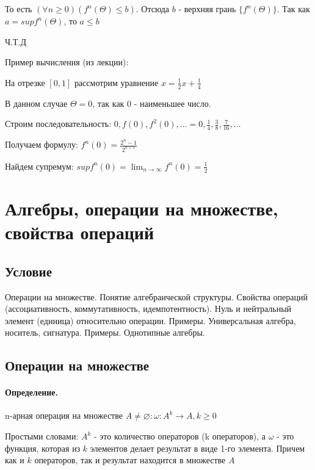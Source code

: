 \documentclass{report}
\begin{document}
То есть $(\forall n \geq 0)(f^{n}(\Theta) \leq b)$. Отсюда $b$ - верхняя грань $\{f^{n}(\Theta)\}$.
Так как $a = supf^{n}(\Theta)$, то $a \leq b$

\medskip

Ч.Т.Д

\medskip

Пример вычисления (из лекции):

На отрезке $[0,1]$ рассмотрим уравнение $x = \frac{1}{2}x + \frac{1}{4}$

В данном случае $\Theta = 0$, так как $0$ - наименьшее число.

Строим последовательность: $0, f(0), f^{2}(0), \ldots =
	0, \frac{1}{4}, \frac{3}{8}, \frac{7}{16}, \ldots$

\medskip

Получаем формулу: $f^{n}(0) = \frac{2^{n} - 1}{2^{n+1}}$

Найдем супремум: $supf^{n}(0) = \lim_{n \to \infty} f^{n}(0) = \frac{1}{2}$

\newpage

\section{Алгебры, операции на множестве, свойства операций}
\subsection{Условие}
Операции на множестве. Понятие алгебраической структуры. Свойства операций
(ассоциативность, коммутативность, идемпотентность). Нуль и нейтральный элемент
(единица) относительно операции. Примеры. Универсальная алгебра, носитель,
сигнатура. Примеры. Однотипные алгебры.

\subsection{Операции на множестве}

\paragraph*{Определение.} n-арная операция на множестве
$A \neq \varnothing: \omega: A^{k} \rightarrow A, k \geq 0$

Простыми словами: $A^{k}$ - это количество операторов (k операторов),
а $\omega$ - это функция, которая из $k$ элементов делает результат в виде 1-го элемента.
Причем как и $k$ операторов, так и результат находится в множестве $A$
\end{document}
